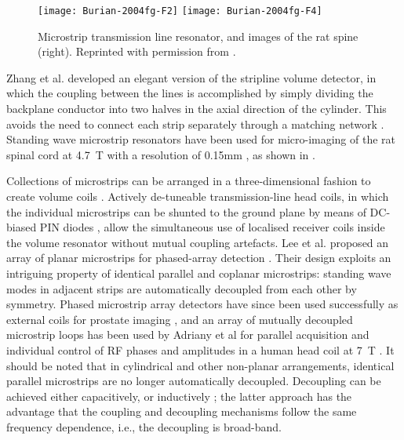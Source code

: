 \begin{figure}
	\begin{center}
		\texttt{[image: Burian-2004fg-F2]}
		\texttt{[image: Burian-2004fg-F4]}
	\end{center}
	\caption{Microstrip transmission line resonator, and images of the rat spine (right). Reprinted with permission from \cite{Burian:2004fg}.}
	\label{fig-Burian-2004fg}
\end{figure}


Zhang et al. developed an elegant version
of the stripline volume detector, in which the coupling between the
lines is accomplished by simply dividing the backplane conductor into
two halves in the axial direction of the cylinder. This avoids the need
to connect each strip separately through a matching network
\cite{Zhang:2003ju}. Standing wave microstrip resonators have been used for
micro-imaging of the rat spinal cord at 4.7~T with a resolution of
0.15mm \cite{Burian:2004fg}, as shown in . 


Collections of microstrips can be arranged in a three-dimensional fashion
to create volume coils \cite{Driesel:2008di}. 
Actively de-tuneable transmission-line head coils, 
in which the individual microstrips
can be shunted to the ground plane by means of DC-biased PIN diodes
\cite{Vaughan:2002cs}, allow the simultaneous use of localised
receiver coils inside the volume resonator without mutual coupling
artefacts. Lee et al. proposed an array of planar microstrips
\cite{Lee:2001ji,Boskamp:2006tl} for phased-array detection
\cite{Roemer:1990gs,Hoult:2004gm}. Their design exploits an intriguing
property of identical parallel and coplanar microstrips: standing wave
modes in adjacent strips are automatically decoupled from each other by
symmetry. Phased microstrip array detectors have since been used
successfully as external coils for prostate imaging
\cite{vandenBergen:2010hg}, and an array of mutually decoupled microstrip
loops has been used by Adriany et al for parallel acquisition and
individual control of RF phases and amplitudes in a human head coil at
7~T \cite{Adriany:2005cw}. It should be noted that in cylindrical and other
non-planar arrangements, identical parallel microstrips are no longer
automatically decoupled. Decoupling can be achieved either capacitively,
or inductively \cite{Wu:2006bs}; the latter approach has the advantage that
the coupling and decoupling mechanisms follow the same frequency
dependence, i.e., the decoupling is broad-band. 


